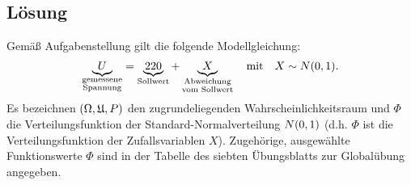 \documentclass{exercise}
\begin{document}
    \subsection*{Lösung}
    Gemäß Aufgabenstellung gilt die folgende Modellgleichung:
    \begin{equation}\label{eq:1}
        \underbrace{U}_{\substack{\text{gemessene}\\\text{Spannung}}} = \underbrace{220}_{\text{Sollwert}} + \underbrace{X}_{\substack{\text{Abweichung}\\\text{vom Sollwert}}} \quad \text{mit} \quad X \sim N\parentheses*{0, 1}.
    \end{equation}
    Es bezeichnen \(\parentheses*{\Omega, \mathfrak{U}, P}\) den zugrundeliegenden Wahrscheinlichkeitsraum und \(\Phi\) die Verteilungsfunktion der Standard-Normalverteilung \(N\parentheses*{0, 1}\) (d.h. \(\Phi\) ist die Verteilungsfunktion der Zufallsvariablen \(X\)).
    Zugehörige, ausgewählte Funktionswerte \(\Phi\) sind in der Tabelle des siebten Übungsblatts zur Globalübung angegeben.
\end{document}

